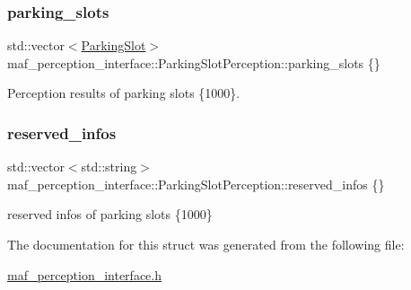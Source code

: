 \subsubsection{\texorpdfstring{parking\+\_\+slots}{parking\_slots}}
{\footnotesize\ttfamily std\+::vector$<$\hyperlink{structmaf__perception__interface_1_1ParkingSlot}{Parking\+Slot}$>$ maf\+\_\+perception\+\_\+interface\+::\+Parking\+Slot\+Perception\+::parking\+\_\+slots \{\}}



Perception results of parking slots \{1000\}. 

\mbox{\label{structmaf__perception__interface_1_1ParkingSlotPerception_a9018d6d208bf8a0d43db6ec2c17c4314}} 
\subsubsection{\texorpdfstring{reserved\+\_\+infos}{reserved\_infos}}
{\footnotesize\ttfamily std\+::vector$<$std\+::string$>$ maf\+\_\+perception\+\_\+interface\+::\+Parking\+Slot\+Perception\+::reserved\+\_\+infos \{\}}



reserved infos of parking slots \{1000\} 



The documentation for this struct was generated from the following file\+:\begin{DoxyCompactItemize}
\item 
\hyperlink{maf__perception__interface_8h}{maf\+\_\+perception\+\_\+interface.\+h}\end{DoxyCompactItemize}
